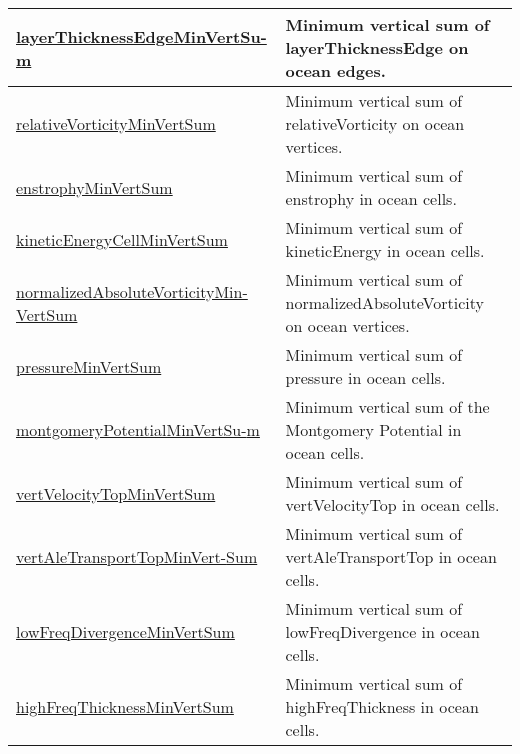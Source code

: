 {\begin{center}
\begin{longtable}{| p{2.0in} | p{4.0in} |}
    \hline
    \hyperref[subsec:var_sec_globalStatsAM_layerThicknessEdgeMinVertSum]{layerThicknessEdgeMinVertSu-}\hyperref[subsec:var_sec_globalStatsAM_layerThicknessEdgeMinVertSum]{m}  & Minimum vertical sum of layerThicknessEdge on ocean edges. \\
    \hline
    \hyperref[subsec:var_sec_globalStatsAM_relativeVorticityMinVertSum]{relativeVorticityMinVertSum} & Minimum vertical sum of relativeVorticity on ocean vertices. \\
    \hline
    \hyperref[subsec:var_sec_globalStatsAM_enstrophyMinVertSum]{enstrophyMinVertSum} & Minimum vertical sum of enstrophy in ocean cells. \\
    \hline
    \hyperref[subsec:var_sec_globalStatsAM_kineticEnergyCellMinVertSum]{kineticEnergyCellMinVertSum} & Minimum vertical sum of kineticEnergy in ocean cells. \\
    \hline
    \hyperref[subsec:var_sec_globalStatsAM_normalizedAbsoluteVorticityMinVertSum]{normalizedAbsoluteVorticityMin-}\hyperref[subsec:var_sec_globalStatsAM_normalizedAbsoluteVorticityMinVertSum]{VertSum}  & Minimum vertical sum of normalizedAbsoluteVorticity on ocean vertices. \\
    \hline
    \hyperref[subsec:var_sec_globalStatsAM_pressureMinVertSum]{pressureMinVertSum} & Minimum vertical sum of pressure in ocean cells. \\
    \hline
    \hyperref[subsec:var_sec_globalStatsAM_montgomeryPotentialMinVertSum]{montgomeryPotentialMinVertSu-}\hyperref[subsec:var_sec_globalStatsAM_montgomeryPotentialMinVertSum]{m}  & Minimum vertical sum of the Montgomery Potential in ocean cells. \\
    \hline
    \hyperref[subsec:var_sec_globalStatsAM_vertVelocityTopMinVertSum]{vertVelocityTopMinVertSum} & Minimum vertical sum of vertVelocityTop in ocean cells. \\
    \hline
    \hyperref[subsec:var_sec_globalStatsAM_vertAleTransportTopMinVertSum]{vertAleTransportTopMinVert-}\hyperref[subsec:var_sec_globalStatsAM_vertAleTransportTopMinVertSum]{Sum}  & Minimum vertical sum of vertAleTransportTop in ocean cells. \\
    \hline
    \hyperref[subsec:var_sec_globalStatsAM_lowFreqDivergenceMinVertSum]{lowFreqDivergenceMinVertSum} & Minimum vertical sum of lowFreqDivergence in ocean cells. \\
    \hline
    \hyperref[subsec:var_sec_globalStatsAM_highFreqThicknessMinVertSum]{highFreqThicknessMinVertSum} & Minimum vertical sum of highFreqThickness in ocean cells. \\

\end{longtable}
\end{center}}
